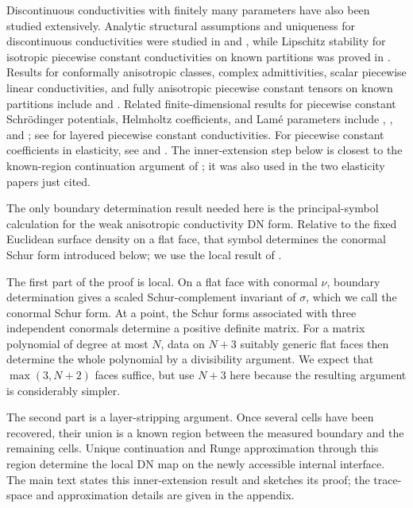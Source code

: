 \documentclass[10pt,a4paper]{amsart}
\begin{document}
Discontinuous conductivities with finitely many parameters have also been
studied extensively.  Analytic structural assumptions and
uniqueness for discontinuous conductivities were studied in
\cite{KohnVogelius1984,KohnVogelius1985} and \cite{Isakov1988}, while Lipschitz stability
for isotropic piecewise constant conductivities on known partitions was proved
in \cite{AlessandriniVessella2005}.  Results for conformally anisotropic
classes, complex admittivities, scalar piecewise linear conductivities, and
fully anisotropic piecewise constant tensors on known partitions include
\cite{BerettaFrancini2011,GaburroSincich2015} and
\cite{AlessandriniDeHoopGaburroSincich2016,AlessandriniDeHoopGaburro2017}.
Related finite-dimensional results for piecewise constant Schr\"odinger
potentials, Helmholtz coefficients, and Lam\'e parameters include
\cite{BerettaDeHoopQiu2012}, \cite{BerettaDeHoopQiuScherzer2014}, and
\cite{BerettaFranciniVessella2013};
see \cite{Garde2020} for layered piecewise constant conductivities.  For
piecewise constant coefficients in elasticity, see
\cite{CarsteaHondaNakamura2018} and \cite{CarsteaNakamuraOksanen2019}.
The inner-extension step below is closest to the known-region continuation
argument of \cite{Ikehata2002}; it was also used in the two elasticity papers
just cited.

The only boundary determination result needed here is the principal-symbol
calculation for the weak anisotropic conductivity DN form.  Relative to the
fixed Euclidean surface density on a flat face, that symbol determines the
conormal Schur form introduced below; we use the local result of
\cite{KangYun2003}.


The first part of the proof is local.  On a flat face with conormal \(\nu\),
boundary determination gives a scaled Schur-complement invariant of \(\sigma\),
which we call the conormal Schur form.  At a point, the Schur forms associated
with three independent conormals determine a positive definite matrix.  For a
matrix polynomial of degree at most \(N\), data on \(N+3\) suitably generic
flat faces then determine the whole polynomial by a divisibility argument.  We
expect that \(\max(3,N+2)\) faces suffice, but use \(N+3\) here because the
resulting argument is considerably simpler.

The second part is a layer-stripping argument.  Once several cells have been
recovered, their union is a known region between the measured boundary and the
remaining cells.  Unique continuation and Runge approximation through this
region determine the local DN map on the newly accessible internal interface.
The main text states this inner-extension result and sketches its proof; the
trace-space and approximation details are given in the appendix.
\end{document}

